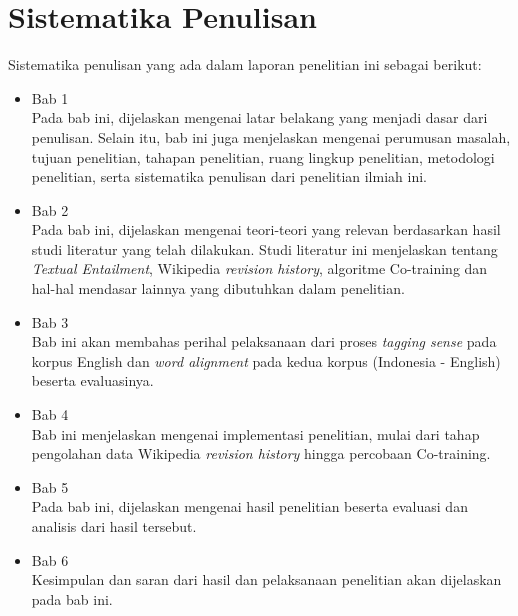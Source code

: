 \section{Sistematika Penulisan}
Sistematika penulisan yang ada dalam laporan penelitian ini sebagai berikut:
\begin{itemize}
	
	\item Bab 1 \babSatu \\
	Pada bab ini, dijelaskan mengenai latar belakang yang menjadi dasar dari penulisan. Selain itu, bab ini juga menjelaskan mengenai perumusan masalah, tujuan penelitian, tahapan penelitian, ruang lingkup penelitian, metodologi penelitian, serta sistematika penulisan dari penelitian ilmiah ini.
	
	\item Bab 2 \babDua \\
	Pada bab ini, dijelaskan mengenai teori-teori yang relevan berdasarkan hasil studi literatur yang telah dilakukan. Studi literatur ini menjelaskan tentang \textit{Textual Entailment}, Wikipedia \textit{revision history}, algoritme Co-training dan hal-hal mendasar lainnya yang dibutuhkan dalam penelitian.
	
	\item Bab 3 \babTiga \\
	Bab ini akan membahas perihal pelaksanaan dari proses \textit{tagging sense} pada korpus English dan \textit{word alignment} pada kedua korpus (Indonesia - English) beserta evaluasinya.
	
	\item Bab 4 \babEmpat \\
	Bab ini menjelaskan mengenai implementasi penelitian, mulai dari tahap pengolahan data Wikipedia \textit{revision history} hingga percobaan Co-training.
	
	\item Bab 5 \babLima \\
	Pada bab ini, dijelaskan mengenai hasil penelitian beserta evaluasi dan analisis dari hasil tersebut. 
	
	\item Bab 6 \babEnam \\
	Kesimpulan dan saran dari hasil dan pelaksanaan penelitian akan dijelaskan pada bab ini.
	
\end{itemize}